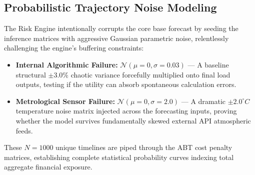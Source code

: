 \documentclass[11pt,a4paper]{article}
\begin{document}
\subsection{Probabilistic Trajectory Noise Modeling}
The Risk Engine intentionally corrupts the core base forecast by seeding the inference matrices with aggressive Gaussian parametric noise, relentlessly challenging the engine's buffering constraints:
\begin{itemize}
    \item \textbf{Internal Algorithmic Failure:} $\mathcal{N}(\mu=0, \sigma=0.03)$ --- A baseline structural $\pm 3.0\%$ chaotic variance forcefully multiplied onto final load outputs, testing if the utility can absorb spontaneous calculation errors.
    \item \textbf{Metrological Sensor Failure:} $\mathcal{N}(\mu=0, \sigma=2.0)$ --- A dramatic $\pm 2.0^\circ C$ temperature noise matrix injected across the forecasting inputs, proving whether the model survives fundamentally skewed external API atmospheric feeds.
\end{itemize}
These $N=1000$ unique timelines are piped through the ABT cost penalty matrices, establishing complete statistical probability curves indexing total aggregate financial exposure.
\end{document}
